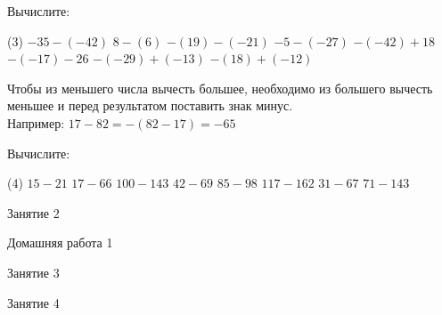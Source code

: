 \begin{class}[number=1]
\begin{listofex}[resume]
\item Вычислите:
\begin{tasks}(3)
	\task \( -35 - (-42) \)
	\task \( 8-(6) \)
	\task \( -(19)-(-21) \)
	\task \( -5-(-27) \)
	\task \( -(-42)+18 \)
	\task \( -(-17)-26 \)
	\task \( -(-29)+(-13) \)
	\task \( -(18)+(-12) \)
\end{tasks}
\end{listofex}
\begin{definit}
Чтобы из меньшего числа вычесть большее, необходимо из большего вычесть меньшее и перед результатом поставить знак минус. \\ Например: \( 17-82 = -(82-17)=-65 \)
\end{definit}
\begin{listofex}[resume]
\item Вычислите:
\begin{tasks}(4)
	\task \( 15-21 \)
	\task \( 17-66 \)
	\task \( 100-143 \)
	\task \( 42-69 \)
	\task \( 85-98 \)
	\task \( 117-162 \)
	\task \( 31-67 \)
	\task \( 71-143 \)
\end{tasks}
	\end{listofex}
\end{class}

\begin{class}[number=2]
	\begin{listofex}
		\item Занятие 2
	\end{listofex}
\end{class}

\begin{homework}[number=1]
	\begin{listofex}
		\item Домашняя работа 1
	\end{listofex}
\end{homework}

\begin{class}[number=3]
	\begin{listofex}
		\item Занятие 3 
	\end{listofex}
\end{class}

\begin{class}[number=4]
	\begin{listofex}
		\item Занятие 4
	\end{listofex}
\end{class}

